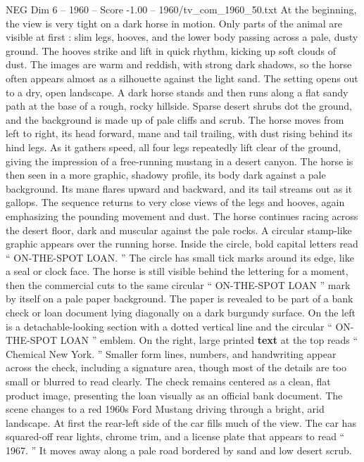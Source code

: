 \begin{textsample}{NEG Dim 6 – 1960 – Score -1.00 – 1960/tv\_com\_1960\_50.txt}  \label{ex:f6_neg_075}
At the beginning, the view is very tight on a dark horse in motion.
Only parts of the animal are visible at first : slim legs, hooves, and the lower body passing across a pale, dusty ground.
The hooves strike and lift in quick rhythm, kicking up soft clouds of dust.
The images are warm and reddish, with strong dark shadows, so the horse often appears almost as a silhouette against the light sand.
The setting opens out to a dry, open landscape.
A dark horse stands and then runs along a flat sandy path at the base of a rough, rocky hillside.
Sparse desert shrubs dot the ground, and the background is made up of pale cliffs and scrub.
The horse moves from left to right, its head forward, mane and tail trailing, with dust rising behind its hind legs.
As it gathers speed, all four legs repeatedly lift clear of the ground, giving the impression of a free-running mustang in a desert canyon.
The horse is then seen in a more graphic, shadowy profile, its body dark against a pale background.
Its mane flares upward and backward, and its tail streams out as it gallops.
The sequence returns to very close views of the legs and hooves, again emphasizing the pounding movement and dust.
The horse continues racing across the desert floor, dark and muscular against the pale rocks.
A circular stamp-like graphic appears over the running horse.
Inside the circle, bold capital letters read “ ON-THE-SPOT LOAN. ” The circle has small tick marks around its edge, like a seal or clock face.
The horse is still visible behind the lettering for a moment, then the commercial cuts to the same circular “ ON-THE-SPOT LOAN ” mark by itself on a pale paper background.
The paper is revealed to be part of a bank check or loan document lying diagonally on a dark burgundy surface.
On the left is a detachable-looking section with a dotted vertical line and the circular “ ON-THE-SPOT LOAN ” emblem.
On the right, large printed \textbf{text} at the top reads “ Chemical New York. ” Smaller form lines, numbers, and handwriting appear across the check, including a signature area, though most of the details are too small or blurred to read clearly.
The check remains centered as a clean, flat product image, presenting the loan visually as an official bank document.
The scene changes to a red 1960s Ford Mustang driving through a bright, arid landscape.
At first the rear-left side of the car fills much of the view.
The car has squared-off rear lights, chrome trim, and a license plate that appears to read “ 1967. ” It moves away along a pale road bordered by sand and low desert scrub.

\end{textsample}
